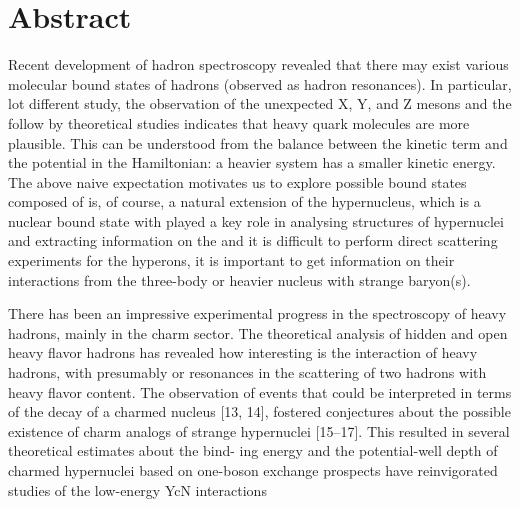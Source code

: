 \documentclass[12pt,a4paper]{book}
\begin{document}
	
	\tableofcontents  %
	
	\chapter{Abstract}
	
	Recent development of hadron spectroscopy revealed that there may exist various molecular bound states of hadrons (observed as hadron resonances). In particular, lot different study,  the observation	of the unexpected X, Y, and Z mesons and the follow by theoretical studies indicates that heavy quark molecules are more plausible. This can be understood from the balance between the kinetic term and the potential in the Hamiltonian: a heavier system has a smaller kinetic
	energy. The above naive expectation motivates us to explore possible bound states composed of
	is, of course, a natural extension of the hypernucleus, which is a nuclear bound state with
	played a key role in analysing structures of hypernuclei and extracting information on the
	and it is difficult to perform direct scattering experiments for the hyperons, it is important
	to get information on their interactions from the three-body or heavier nucleus with strange
	baryon(s).
	
	There has been an impressive experimental progress in the spectroscopy of heavy hadrons,
	mainly in the charm sector. The theoretical analysis of hidden and open heavy flavor
	hadrons has revealed how interesting is the interaction of heavy hadrons, with presumably
	or resonances in the scattering of two hadrons with heavy flavor content.  The observation of events that could be interpreted in terms of the decay of a
	charmed nucleus [13, 14], fostered conjectures about the possible existence of charm analogs
	of strange hypernuclei [15–17]. This resulted in several theoretical estimates about the bind-
	ing energy and the potential-well depth of charmed hypernuclei based on one-boson exchange
	prospects have reinvigorated studies of the low-energy YcN interactions
	
\end{document}
